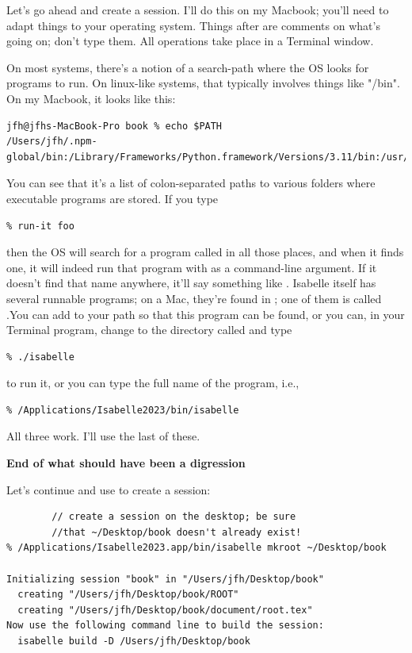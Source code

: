 Let's go ahead and create a session. I'll do this on my Macbook; you'll need to adapt things to your operating system. Things after \sys{//} are comments on what's going on; don't type them. All operations take place in a Terminal window. 

{
On most systems, there's a notion of a search-path where the OS looks for programs to run. On linux-like systems, that typically involves things like "/bin". On my Macbook, it looks like this:
\begin{verbatim}
jfh@jfhs-MacBook-Pro book % echo $PATH
/Users/jfh/.npm-global/bin:/Library/Frameworks/Python.framework/Versions/3.11/bin:/usr/local/bin:/usr/bin:/bin:/usr/sbin:/sbin:/Library/TeX/texbin:/opt/X11/bin:/Library/Apple/usr/bin:/Users/jfh/.rvm/bin
\end{verbatim}

You can see that it's a list of colon-separated paths to various folders where executable programs are stored. If you type

\begin{verbatim}
% run-it foo
\end{verbatim}
\noindent
then the OS will search for a program called  in all those places, and when it finds one, it will indeed run that program with  as a command-line argument. If it doesn't find that name anywhere, it'll say something like . Isabelle itself has several runnable programs; on a Mac, they're found in ; one of them is called .You can add  to your path so that this program can be found, or you can, in your Terminal program, change to the directory called  and type 
\begin{verbatim}    
% ./isabelle
\end{verbatim}

to run it, or you can type the full name of the program, i.e., 
\begin{verbatim}
% /Applications/Isabelle2023/bin/isabelle
\end{verbatim}    

All three work. I'll use the last of these. 
}

\textbf{End of what should have been a digression}

Let's continue and use  to create a session:
\begin{verbatim}      
        // create a session on the desktop; be sure 
        //that ~/Desktop/book doesn't already exist!
% /Applications/Isabelle2023.app/bin/isabelle mkroot ~/Desktop/book  

Initializing session "book" in "/Users/jfh/Desktop/book"
  creating "/Users/jfh/Desktop/book/ROOT"
  creating "/Users/jfh/Desktop/book/document/root.tex"
Now use the following command line to build the session:
  isabelle build -D /Users/jfh/Desktop/book
\end{verbatim}


